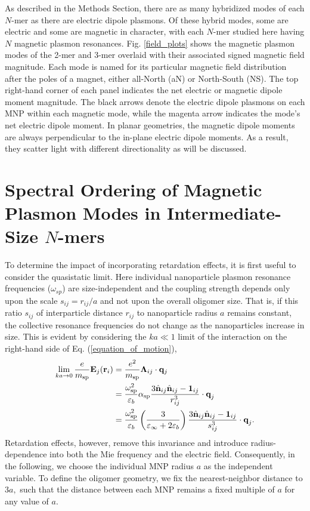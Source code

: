 \documentclass[journal=apchd5,manuscript=article]{achemso}
\begin{document}
As described in the Methods Section, there are as many hybridized modes of each $N$-mer as there are electric dipole plasmons. Of these hybrid modes, some are electric and some are magnetic in character, with each $N$-mer studied here having $N$ magnetic plasmon resonances. Fig. \ref{field_plots} shows the magnetic plasmon modes of the 2-mer and 3-mer overlaid with their associated signed magnetic field magnitude. Each mode is named for its particular magnetic field distribution after the poles of a magnet, either all-North (aN) or North-South (NS). The top right-hand corner of each panel indicates the net electric or magnetic dipole moment magnitude. The black arrows denote the electric dipole plasmons on each MNP within each magnetic mode, while the magenta arrow indicates the mode's net electric dipole moment. In planar geometries, the magnetic dipole moments are always perpendicular to the in-plane electric dipole moments. As a result, they scatter light with different directionality as will be discussed.




\section*{Spectral Ordering of Magnetic Plasmon Modes in Intermediate-Size $N$-mers}
To determine the impact of incorporating retardation effects, it is first useful to consider the quasistatic limit. Here individual nanoparticle plasmon resonance frequencies ($\omega_{sp}$) are size-independent and the coupling strength depends only upon the scale $s_{ij} = r_{ij}/a$ and not upon the overall oligomer size. That is, if this ratio $s_{ij}$ of interparticle distance $r_{ij}$ to nanoparticle radius $a$ remains constant, the collective resonance frequencies do not change as the nanoparticles increase in size. This is evident by considering the $ka\ll 1$ limit of the interaction on the right-hand side of Eq. (\ref{equation_of_motion}),
\begin{equation}
\begin{aligned}
\lim_{ka \to 0}\frac{e}{m_{\textrm{sp}}}\textbf{E}_j(\textbf{r}_i) &= \frac{e^2}{m_{\textrm{sp}}}\boldsymbol{\Lambda}_{ij}\cdot{\bf q}_j\\ 
&= \frac{\omega_{\textrm{sp}}^2}{\varepsilon_b}\alpha_{\textrm{sp}}\frac{3\hat{\textbf{n}}_{ij}\hat{\textbf{n}}_{ij} - \textbf{1}_{ij}}{r_{ij}^3} \cdot \textbf{q}_j \\
&= \frac{\omega_{\textrm{sp}}^2}{\varepsilon_b} \left(\frac{3}{\varepsilon_{\infty}+2\varepsilon_b}\right)\frac{3\hat{\textbf{n}}_{ij}\hat{\textbf{n}}_{ij} - \textbf{1}_{ij}}{s_{ij}^3} \cdot \textbf{q}_j.
\end{aligned}
\label{quasistatic_coupling}
\end{equation}
Retardation effects, however, remove this invariance and introduce radius-dependence into both the Mie frequency and the electric field. Consequently, in the following, we choose the individual MNP radius $a$ as the independent variable. To define the oligomer geometry, we fix the nearest-neighbor distance to $3a,$ such that the distance between each MNP remains a fixed multiple of $a$ for any value of $a.$
\end{document}
